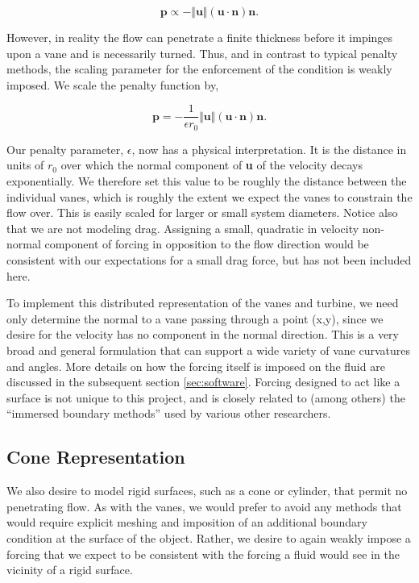 \begin{equation}
 \textbf{p} \propto -\Vert \textbf{u} \Vert \left(\textbf{u} \cdot
					     \textbf{n} \right) 
  \textbf{n}.
\end{equation}

However, in reality the flow can penetrate a finite thickness
before it impinges upon a vane and is necessarily turned. Thus, and in
contrast to typical penalty methods, the scaling parameter for the
enforcement of the condition is weakly imposed. We scale the penalty
function by, 

\begin{equation}
 \textbf{p} = - \frac{1}{\epsilon r_0} \Vert \textbf{u} \Vert
  \left(\textbf{u} \cdot \textbf{n}\right) \textbf{n}.
\end{equation}

Our penalty parameter, $\epsilon$, now has a physical interpretation.
It is the distance in units of $r_0$ over which the normal component
of \textbf{u} of the velocity decays exponentially. We therefore set
this value to be roughly the distance between the individual vanes,
which is roughly the extent we expect the vanes to constrain the flow
over. This is easily scaled for larger or small system diameters. 
Notice also that we are not modeling drag. Assigning a small, quadratic
in velocity non-normal component of forcing in opposition to the flow direction
would be consistent with our expectations for a small drag force, but
has not been included here. 

To implement this distributed representation of the vanes and turbine,
we need only determine the normal to a vane passing through a
point (x,y), since we desire for the velocity has no component in the
normal direction. This is a very broad and general formulation that can
support a wide variety of vane curvatures and angles. More details on
how the forcing itself is imposed on the fluid are discussed in the
subsequent section \ref{sec:software}. Forcing designed to act like a surface
is not unique to this project, and is closely related to (among others)
the ``immersed boundary methods'' used by various other
researchers\cite{doi:10.1146/annurev.fluid.37.061903.175743}. 

\subsection{Cone Representation}

We also desire to model rigid surfaces, such as a cone or cylinder, that
permit no penetrating flow. As with the vanes, we would prefer to avoid
any methods that would require explicit meshing and imposition of an
additional boundary condition at the surface of the object. Rather, we
desire to again weakly impose a forcing that we expect to be consistent
with the forcing a fluid would see in the vicinity of a rigid surface. 

